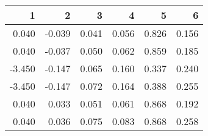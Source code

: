 \begin{table}[ht]
\centering
\begin{tabular}{rrrrrr}
  \hline
1 & 2 & 3 & 4 & 5 & 6 \\ 
  \hline
0.040 & -0.039 & 0.041 & 0.056 & 0.826 & 0.156 \\ 
  0.040 & -0.037 & 0.050 & 0.062 & 0.859 & 0.185 \\ 
  -3.450 & -0.147 & 0.065 & 0.160 & 0.337 & 0.240 \\ 
  -3.450 & -0.147 & 0.072 & 0.164 & 0.388 & 0.255 \\ 
  0.040 & 0.033 & 0.051 & 0.061 & 0.868 & 0.192 \\ 
  0.040 & 0.036 & 0.075 & 0.083 & 0.868 & 0.258 \\ 
   \hline
\end{tabular}
\end{table}
